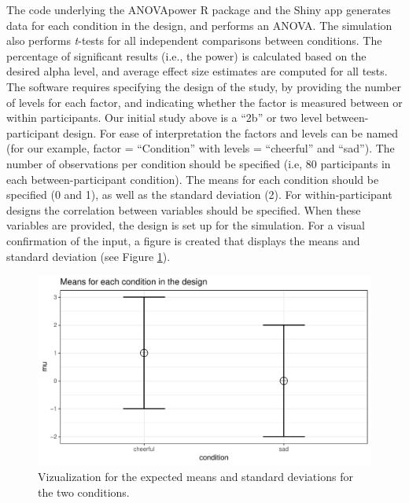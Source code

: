 \documentclass[,jou, draftfirst, a4paper,floatsintext]{apa6}
\begin{document}
The code underlying the ANOVApower R package and the Shiny app generates data for each condition in the design, and performs an ANOVA.
The simulation also performs \emph{t}-tests for all independent comparisons between conditions.
The percentage of significant results (i.e., the power) is calculated based on the desired alpha level, and average effect size estimates are computed for all tests.
The software requires specifying the design of the study, by providing the number of levels for each factor, and indicating whether the factor is measured between or within participants. Our initial study above is a \enquote{2b} or two level between-participant design.
For ease of interpretation the factors and levels can be named (for our example, factor = \enquote{Condition} with levels = \enquote{cheerful} and \enquote{sad}).
The number of observations per condition should be specified (i.e, 80 participants in each between-participant condition).
The means for each condition should be specified (0 and 1), as well as the standard deviation (2).
For within-participant designs the correlation between variables should be specified.
When these variables are provided, the design is set up for the simulation.
For a visual confirmation of the input, a figure is created that displays the means and standard deviation (see Figure \ref{fig:mean-plot2}).

\begin{figure}
\centering
\includegraphics{0.1_Simulation_Based_Power_Analysis_For_Factorial_ANOVA_Designs_files/figure-latex/mean-plot2-1.pdf}
\caption{\label{fig:mean-plot2}Vizualization for the expected means and standard deviations for the two conditions.}
\end{figure}
\end{document}
